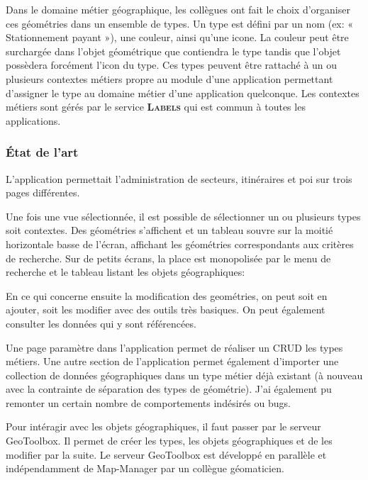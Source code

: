 \documentclass{rapportUHA40}
\begin{document}
Dans le domaine métier géographique, les collègues ont fait le choix
d'organiser ces géométries dans un ensemble de types. Un type est défini par un
nom (ex: « Stationnement payant »), une couleur, ainsi qu'une icone. La couleur
peut être surchargée dans l'objet géométrique que contiendra le type tandis que
l'objet possèdera forcément l'icon du type. Ces types peuvent être rattaché à
un ou plusieurs contextes métiers propre au module d'une application permettant
d'assigner le type au domaine métier d'une application quelconque. Les
contextes métiers sont gérés par le service \textbf{\textsc{Labels}} qui est
commun à toutes les applications.

\subsubsection{État de l'art}
L’application permettait l’administration de secteurs, itinéraires et poi sur
trois pages différentes. 

Une fois une vue sélectionnée, il est possible de sélectionner un ou plusieurs
types soit contextes. Des géométries s'affichent et un tableau souvre sur la
moitié horizontale basse de l'écran, affichant les géométries correspondants
aux critères de recherche. Sur de petits écrans, la place est monopolisée par
le menu de recherche et le tableau listant les objets géographiques:

En ce qui concerne ensuite la modification des geométries, on peut soit en
ajouter, soit les modifier avec des outils très basiques. On peut également
consulter les données qui y sont référencées.

Une page paramètre dans l'application permet de réaliser un CRUD les types
métiers. Une autre section de l'application permet également d'importer une
collection de données géographiques dans un type métier déjà existant (à
nouveau avec la contrainte de séparation des types de géométrie). J'ai
également pu remonter un certain nombre de comportements indésirés ou bugs.

Pour intéragir avec les objets géographiques, il faut passer par le serveur
GeoToolbox. Il permet de créer les types, les objets géographiques et de les
modifier par la suite. Le serveur GeoToolbox est développé en parallèle et
indépendamment de Map-Manager par un collègue géomaticien.
\end{document}

